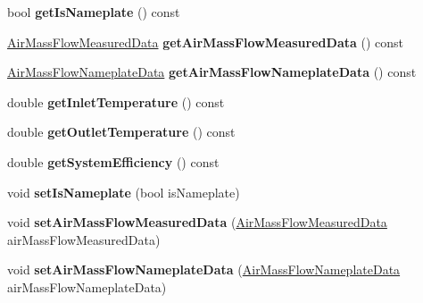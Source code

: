 \begin{DoxyCompactItemize}
\mbox{\label{class_air_mass_flow_data_aa49758b3dce624e809516d1de491a6e0}} 
bool {\bfseries get\+Is\+Nameplate} () const
\item 
\mbox{\label{class_air_mass_flow_data_ae466ca20e42fe074cf735ba8b35292b1}} 
\hyperlink{class_air_mass_flow_measured_data}{Air\+Mass\+Flow\+Measured\+Data} {\bfseries get\+Air\+Mass\+Flow\+Measured\+Data} () const
\item 
\mbox{\label{class_air_mass_flow_data_a27a801c30b89d8d24eaf99b5c181e30d}} 
\hyperlink{class_air_mass_flow_nameplate_data}{Air\+Mass\+Flow\+Nameplate\+Data} {\bfseries get\+Air\+Mass\+Flow\+Nameplate\+Data} () const
\item 
\mbox{\label{class_air_mass_flow_data_aa762f7785c199cd66f20f334888416ef}} 
double {\bfseries get\+Inlet\+Temperature} () const
\item 
\mbox{\label{class_air_mass_flow_data_a5e2bf395cd4294a11a8497b12cf6d9c2}} 
double {\bfseries get\+Outlet\+Temperature} () const
\item 
\mbox{\label{class_air_mass_flow_data_ad01e82b308d2153eaef3818430c18c6a}} 
double {\bfseries get\+System\+Efficiency} () const
\item 
\mbox{\label{class_air_mass_flow_data_a8093e119b1bf0c0dc082574660b56ab3}} 
void {\bfseries set\+Is\+Nameplate} (bool is\+Nameplate)
\item 
\mbox{\label{class_air_mass_flow_data_af4d68a24b3f250549a0b33bda04b0cf4}} 
void {\bfseries set\+Air\+Mass\+Flow\+Measured\+Data} (\hyperlink{class_air_mass_flow_measured_data}{Air\+Mass\+Flow\+Measured\+Data} air\+Mass\+Flow\+Measured\+Data)
\item 
\mbox{\label{class_air_mass_flow_data_adad30e62e8d6536620ad6c57ae1fd28d}} 
void {\bfseries set\+Air\+Mass\+Flow\+Nameplate\+Data} (\hyperlink{class_air_mass_flow_nameplate_data}{Air\+Mass\+Flow\+Nameplate\+Data} air\+Mass\+Flow\+Nameplate\+Data)
\item 

\end{DoxyCompactItemize}
